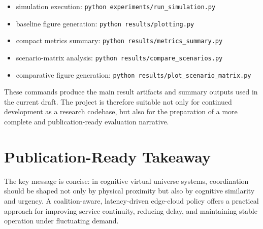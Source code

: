 \documentclass[11pt]{article}
\begin{document}
\begin{itemize}
    \item simulation execution: \texttt{python experiments/run\_simulation.py}
    \item baseline figure generation: \texttt{python results/plotting.py}
    \item compact metrics summary: \texttt{python results/metrics\_summary.py}
    \item scenario-matrix analysis: \texttt{python results/compare\_scenarios.py}
    \item comparative figure generation: \texttt{python results/plot\_scenario\_matrix.py}
\end{itemize}

These commands produce the main result artifacts and summary outputs used in the current draft. The project is therefore suitable not only for continued development as a research codebase, but also for the preparation of a more complete and publication-ready evaluation narrative.

\section{Publication-Ready Takeaway}
The key message is concise: in cognitive virtual universe systems, coordination should be shaped not only by physical proximity but also by cognitive similarity and urgency. A coalition-aware, latency-driven edge-cloud policy offers a practical approach for improving service continuity, reducing delay, and maintaining stable operation under fluctuating demand.
\end{document}
